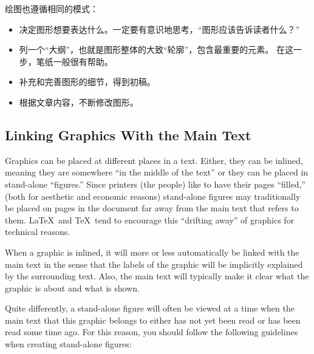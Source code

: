 绘图也遵循相同的模式：

\eohs

\begin{itemize}
\item
  决定图形想要表达什么。一定要有意识地思考，“图形应该告诉读者什么？”
\item
  列一个“大纲”，也就是图形整体的大致“轮廓”，包含最重要的元素。
  在这一步，笔纸一般很有帮助。
\item
  补充和完善图形的细节，得到初稿。
\item
  根据文章内容，不断修改图形。
\end{itemize}


\subsection{Linking Graphics With the Main Text}

\bohs

Graphics can be placed at different places in a text. Either, they can
be inlined, meaning they are somewhere ``in the middle of the text''
or they can be placed in stand-alone ``figures.'' Since printers (the
people) like to have their pages ``filled,'' (both for aesthetic and
economic reasons) stand-alone figures may traditionally be placed on
pages in the document far away from the main text that refers to
them. \LaTeX\ and \TeX\ tend to encourage this ``drifting away'' of
graphics for technical reasons.

When a graphic is inlined, it will more or less automatically be
linked with the main text in the sense that the labels of the graphic
will be implicitly explained by the surrounding text. Also, the main
text will typically make it clear what the graphic is about and what
is shown.

Quite differently, a stand-alone figure will often be viewed at a time
when the main text that this graphic belongs to either has not yet
been read or has been read some time ago. For this reason, you should
follow the following guidelines when creating stand-alone figures:

